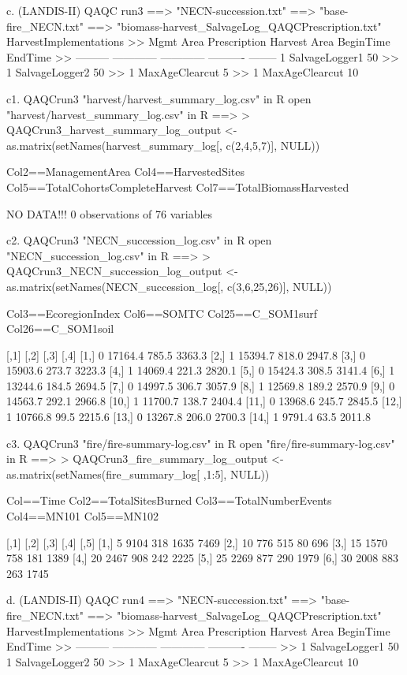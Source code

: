 	c. (LANDIS-II) QAQC run3 
		==> "NECN-succession.txt"
		==> "base-fire_NECN.txt"
		==> "biomass-harvest_SalvageLog_QAQCPrescription.txt"
    HarvestImplementations
>>	Mgmt Area	Prescription	Harvest Area	BeginTime	EndTime
>>	---------	------------	------------	----------	--------
	1		SalvageLogger1		50%
>>	1		SalvageLogger2		50%
>>	1		MaxAgeClearcut		5%
>>	1		MaxAgeClearcut		10%



	c1. QAQCrun3 "harvest/harvest_summary_log.csv" in R
open "harvest/harvest_summary_log.csv" in R ==>
> QAQCrun3_harvest_summary_log_output <- as.matrix(setNames(harvest_summary_log[, c(2,4,5,7)], NULL))

Col2==ManagementArea
Col4==HarvestedSites
Col5==TotalCohortsCompleteHarvest
Col7==TotalBiomassHarvested

	NO DATA!!!
	0 observations of 76 variables


	c2. QAQCrun3 "NECN_succession_log.csv" in R
open "NECN_succession_log.csv" in R ==>
> QAQCrun3_NECN_succession_log_output <- as.matrix(setNames(NECN_succession_log[, c(3,6,25,26)], NULL))

Col3==EcoregionIndex
Col6==SOMTC
Col25==C_SOM1surf
Col26==C_SOM1soil

       [,1]    [,2]  [,3]   [,4]
 [1,]    0 17164.4 785.5 3363.3
 [2,]    1 15394.7 818.0 2947.8
 [3,]    0 15903.6 273.7 3223.3
 [4,]    1 14069.4 221.3 2820.1
 [5,]    0 15424.3 308.5 3141.4
 [6,]    1 13244.6 184.5 2694.5
 [7,]    0 14997.5 306.7 3057.9
 [8,]    1 12569.8 189.2 2570.9
 [9,]    0 14563.7 292.1 2966.8
[10,]    1 11700.7 138.7 2404.4
[11,]    0 13968.6 245.7 2845.5
[12,]    1 10766.8  99.5 2215.6
[13,]    0 13267.8 206.0 2700.3
[14,]    1  9791.4  63.5 2011.8


	c3. QAQCrun3 "fire/fire-summary-log.csv" in R
open "fire/fire-summary-log.csv" in R ==>
> QAQCrun3_fire_summary_log_output <- as.matrix(setNames(fire_summary_log[ ,1:5], NULL))

Col==Time
Col2==TotalSitesBurned
Col3==TotalNumberEvents
Col4==MN101
Col5==MN102

     [,1] [,2] [,3] [,4] [,5]
[1,]    5 9104  318 1635 7469
[2,]   10  776  515   80  696
[3,]   15 1570  758  181 1389
[4,]   20 2467  908  242 2225
[5,]   25 2269  877  290 1979
[6,]   30 2008  883  263 1745







	d. (LANDIS-II) QAQC run4 
		==> "NECN-succession.txt"
		==> "base-fire_NECN.txt"
		==> "biomass-harvest_SalvageLog_QAQCPrescription.txt"
    HarvestImplementations
>>	Mgmt Area	Prescription	Harvest Area	BeginTime	EndTime
>>	---------	------------	------------	----------	--------
>>	1		SalvageLogger1		50%
	1		SalvageLogger2		50%
>>	1		MaxAgeClearcut		5%
>>	1		MaxAgeClearcut		10%



